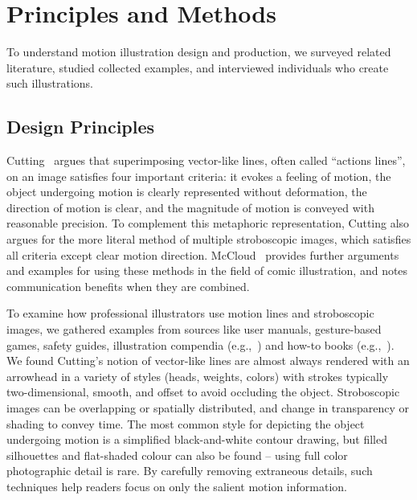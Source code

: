 
\section{Principles and Methods}

To understand motion illustration design and production, we surveyed related literature, studied collected examples, and interviewed individuals who create such illustrations.

\subsection{Design Principles}
Cutting~\cite{cutting_representing_2002} argues that superimposing vector-like lines, often called ``actions lines'', on an image satisfies four important criteria: it evokes a feeling of motion, the object undergoing motion is clearly represented without deformation, the direction of motion is clear, and the magnitude of motion is conveyed with reasonable precision. To complement this metaphoric representation, Cutting also argues for the more literal method of multiple stroboscopic images, which satisfies all criteria except clear motion direction. McCloud~\cite{mccloud_understanding_1994} provides further arguments and examples for using these methods in the field of comic illustration, and notes communication benefits when they are combined.

To examine how professional illustrators use motion lines and stroboscopic images, we gathered examples from sources like user manuals, gesture-based games, safety guides, %
illustration compendia (e.g.,~\cite{mijksenaar1999open}) and how-to books (e.g.,~\cite{greenberg2012sketching}).
%
We found Cutting's notion of vector-like lines are almost always rendered with an arrowhead %
in a variety of styles (heads, weights, colors) with strokes typically two-dimensional, smooth, and offset to avoid occluding the object.
Stroboscopic images can be overlapping or spatially distributed, and change in transparency or shading to convey time.
The most common style for depicting the object undergoing motion is a simplified black-and-white contour drawing, but filled silhouettes and flat-shaded colour can also be found -- using full color photographic detail is rare.
%
By carefully removing extraneous details, such techniques help readers focus on only the salient motion information.

